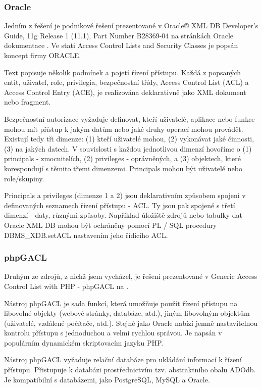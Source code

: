 
\subsubsection{Oracle}
Jedním z řešení je podnikové řešení prezentované v Oracle® XML DB Developer's Guide, 11g Release 1 (11.1), Part Number B28369-04 na stránkách Oracle dokumentace \cite{oracle}. Ve stati Access Control Lists and Security Classes je popsán koncept firmy ORACLE.
 
Text popisuje několik podmínek a pojetí řízení přístupu. Každá z popsaných entit, uživatel, role, privilegia, bezpečnostní třídy, Access Control List (ACL) a Access Control Entry (ACE), je realizována deklarativně jako XML dokument nebo fragment.  

Bezpečnostní autorizace vyžaduje definovat, kteří uživatelé, aplikace nebo funkce mohou mít přístup k jakým datům nebo jaké druhy operací mohou provádět. Existují tedy tři dimenze: (1) kteří uživatelé mohou, (2) vykonávat jaké činnosti, (3) na jakých datech. V souvislosti s každou jednotlivou dimenzí hovoříme o (1) principals - zmocnitelích, (2) privileges - oprávněných, a (3) objektech, které korespondují s těmito třemi dimenzemi. Principals mohou být uživatelé nebo role/skupiny.

Principals a privileges (dimenze 1 a 2) jsou deklarativním způsobem spojeni v definovaných seznamech řízení přístupu - ACL. Ty jsou pak spojené s třetí dimenzí - daty, různými způsoby. Například úložiště zdrojů nebo tabulky dat Oracle XML DB mohou být ochráněny pomocí PL / SQL procedury DBMS\_XDB.setACL nastavením jeho řídícího ACL.


\subsubsection{phpGACL}
Druhým ze zdrojů, z nichž jsem vycházel, je řešení prezentované v Generic Access Control List with PHP - phpGACL na \cite{phpGACL}.

Nástroj phpGACL je sada funkcí, která umožňuje použít řízení přístupu na libovolné objekty (webové stránky, databáze, atd.), jiným libovolným objektům (uživatelé, vzdálené počítače, atd.). 
Stejně jako Oracle nabízí jemně nastavitelnou kontrolu přístupu s jednoduchou a velmi rychlou správou. Je napsán v populárním dynamickém skriptovacím jazyku PHP.

Nástroj phpGACL vyžaduje relační databáze pro ukládání informací k řízení přístupu. Přistupuje k databázi prostřednictvím tzv. abstraktního obalu ADOdb. Je kompatibilní s databázemi, jako PostgreSQL, MySQL a Oracle. 

